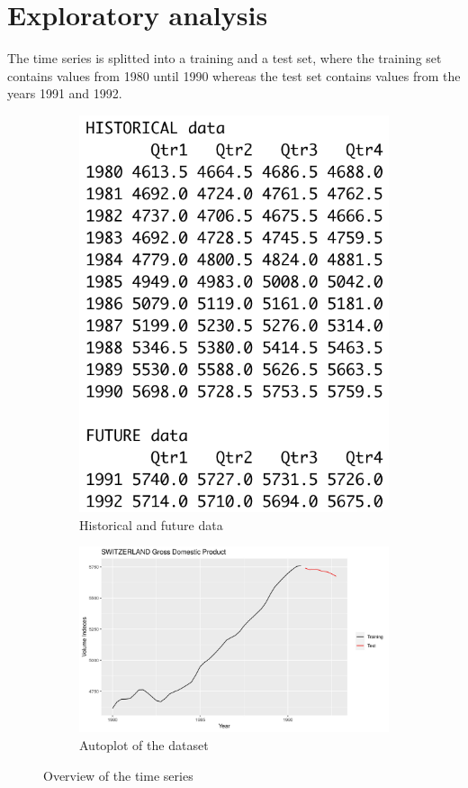 \documentclass[10pt]{article}
\begin{document}
\section{Exploratory analysis}
The time series is splitted into a training and a test set, where the training set contains values from 1980 until 1990 whereas the test set contains values from the years 1991 and 1992. 

\begin{figure}[ht!]
\centering
\begin{subfigure}{.4\textwidth}
  \centering
  \includegraphics[width=0.9\linewidth]{img/m3data.png}
  \caption{Historical and future data}
  \label{fig:data_points}
\end{subfigure}%
\begin{subfigure}{.6\textwidth}
  \centering
  \includegraphics[width=1\textwidth]{img/autoplot.jpeg}  %
  \caption{Autoplot of the dataset}
  \label{fig:autoplot}
\end{subfigure}
\caption{Overview of the time series}
\label{fig:overview_plots}
\end{figure}
\end{document}
